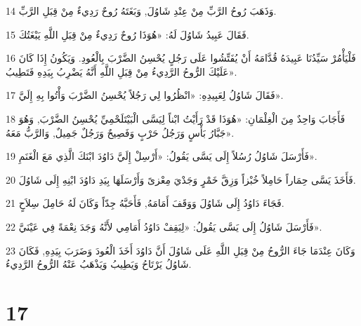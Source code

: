 \par 14 وَذَهَبَ رُوحُ الرَّبِّ مِنْ عِنْدِ شَاوُلَ, وَبَغَتَهُ رُوحٌ رَدِيءٌ مِنْ قِبَلِ الرَّبِّ.
\par 15 فَقَالَ عَبِيدُ شَاوُلَ لَهُ: «هُوَذَا رُوحٌ رَدِيءٌ مِنْ قِبَلِ اللَّهِ يَبْغَتُكَ.
\par 16 فَلْيَأْمُرْ سَيِّدُنَا عَبِيدَهُ قُدَّامَهُ أَنْ يُفَتِّشُوا عَلَى رَجُلٍ يُحْسِنُ الضَّرْبَ بِالْعُودِ. وَيَكُونُ إِذَا كَانَ عَلَيْكَ الرُّوحُ الرَّدِيءُ مِنْ قِبَلِ اللَّهِ أَنَّهُ يَضْرِبُ بِيَدِهِ فَتَطِيبُ».
\par 17 فَقَالَ شَاوُلُ لِعَبِيدِهِ: «انْظُرُوا لِي رَجُلاً يُحْسِنُ الضَّرْبَ وَأْتُوا بِهِ إِلَيَّ».
\par 18 فَأَجَابَ وَاحِدٌ مِنَ الْغِلْمَانِ: «هُوَذَا قَدْ رَأَيْتُ ابْناً لِيَسَّى الْبَيْتَلَحْمِيِّ يُحْسِنُ الضَّرْبَ, وَهُوَ جَبَّارُ بَأْسٍ وَرَجُلُ حَرْبٍ وَفَصِيحٌ وَرَجُلٌ جَمِيلٌ, وَالرَّبُّ مَعَهُ».
\par 19 فَأَرْسَلَ شَاوُلُ رُسُلاً إِلَى يَسَّى يَقُولُ: «أَرْسِلْ إِلَيَّ دَاوُدَ ابْنَكَ الَّذِي مَعَ الْغَنَمِ».
\par 20 فَأَخَذَ يَسَّى حِمَاراً حَامِلاً خُبْزاً وَزِقَّ خَمْرٍ وَجَدْيَ مِعْزىً وَأَرْسَلَهَا بِيَدِ دَاوُدَ ابْنِهِ إِلَى شَاوُلَ.
\par 21 فَجَاءَ دَاوُدُ إِلَى شَاوُلَ وَوَقَفَ أَمَامَهُ, فَأَحَبَّهُ جِدّاً وَكَانَ لَهُ حَامِلَ سِلاَحٍ.
\par 22 فَأَرْسَلَ شَاوُلُ إِلَى يَسَّى يَقُولُ: «لِيَقِفْ دَاوُدُ أَمَامِي لأَنَّهُ وَجَدَ نِعْمَةً فِي عَيْنَيَّ».
\par 23 وَكَانَ عِنْدَمَا جَاءَ الرُّوحُ مِنْ قِبَلِ اللَّهِ عَلَى شَاوُلَ أَنَّ دَاوُدَ أَخَذَ الْعُودَ وَضَرَبَ بِيَدِهِ, فَكَانَ شَاوُلُ يَرْتَاحُ وَيَطِيبُ وَيَذْهَبُ عَنْهُ الرُّوحُ الرَّدِيءُ.

\chapter{17}

